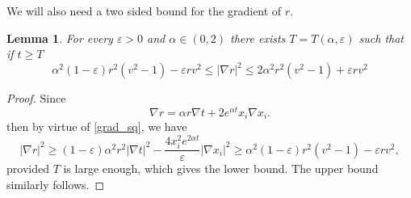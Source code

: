 \documentclass[leqno,11pt]{amsart}
\newtheorem{lemma}[theorem]{Lemma}
\theoremstyle{definition}
\begin{document}
We will also need a two sided bound for the gradient of $r$. 
\begin{lemma}\label{grad_r_size}
For every $\varepsilon>0$ and $\alpha\in (0,2)$ there exists $T=T(\alpha,\varepsilon)$ such that if $t\geq T$
\begin{equation}
 \alpha^2(1-\varepsilon)r^2(v^2-1)-\varepsilon rv^2 \leq |\nabla r|^2 \leq 2\alpha^2r^2(v^2-1)+\varepsilon r v^2
\end{equation}
\end{lemma}
\begin{proof}
Since 
\[
\nabla r= \alpha r\nabla t +2e^{\alpha t}x_i\nabla x_i.
\] 
then by virtue of \eqref{grad_sq}, we have
\begin{equation}
|\nabla r|^2 \geq (1-\varepsilon)\alpha^2 r^2|\nabla t|^2-\frac{4x_i^2e^{2\alpha t}}{\varepsilon}|\nabla x_i|^2\geq \alpha^2(1-\varepsilon)r^2(v^2-1)-\varepsilon rv^2,
\end{equation}
provided $T$ is large enough, which gives the lower bound. The upper bound similarly follows.
\end{proof}
\end{document}
